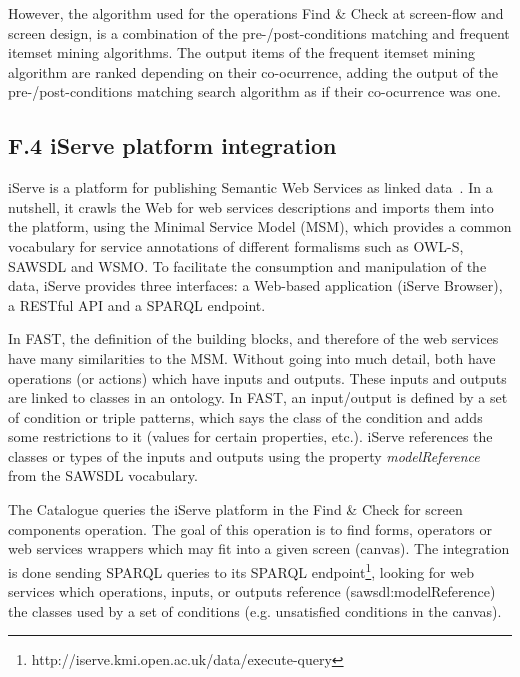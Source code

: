 \documentclass{fast_latex}
\begin{document}
However, the algorithm used for the operations Find \& Check at screen-flow and screen design, is a combination of the pre-/post-conditions matching and frequent itemset mining algorithms. The output items of the frequent itemset mining algorithm are ranked depending on their co-ocurrence, adding the output of the pre-/post-conditions matching search algorithm as if their co-ocurrence was one.


\subsection*{F.4 iServe platform integration}

iServe is a platform for publishing Semantic Web Services as linked data~\cite{oro23093}. In a nutshell, it crawls the Web for web services descriptions and imports them into the platform, using the Minimal Service Model (MSM), which provides a common vocabulary for service annotations of different formalisms such as OWL-S, SAWSDL and WSMO. To facilitate the consumption and manipulation of the data, iServe provides three interfaces: a Web-based application (iServe Browser), a RESTful API and a SPARQL endpoint.

In FAST, the definition of the building blocks, and therefore of the web services have many similarities to the MSM. Without going into much detail, both have operations (or actions) which have inputs and outputs. These inputs and outputs are linked to classes in an ontology. In FAST, an input/output is defined by a set of condition or triple patterns, which says the class of the condition and adds some restrictions to it (values for certain properties, etc.). iServe references the classes or types of the inputs and outputs using the property \emph{modelReference} from the SAWSDL vocabulary.

The Catalogue queries the iServe platform in the Find \& Check for screen components operation. The goal of this operation is to find forms, operators or web services wrappers which may fit into a given screen (canvas). The integration is done sending SPARQL queries to its SPARQL endpoint\footnote{http://iserve.kmi.open.ac.uk/data/execute-query}, looking for web services which operations, inputs, or outputs reference (sawsdl:modelReference) the classes used by a set of conditions (e.g. unsatisfied conditions in the canvas).
\end{document}
